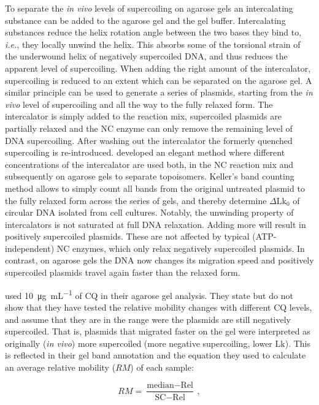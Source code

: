 \documentclass[10pt,a4]{article}
\newcommand{\ugml}{\micro\gram\per\milli\liter}
\newcommand{\lk}{\ensuremath{\text{Lk}}}
\newcommand{\dlkr}{\ensuremath{\Delta\text{Lk}_0}}
\newcommand{\ie}{\textit{i.e.}}
\begin{document}
To separate the \textit{in vivo} levels of supercoiling on agarose
gels an intercalating substance can be added to the agarose gel and
the gel buffer.  Intercalating substances reduce the helix rotation
angle between the two bases they bind to, \ie{}, they locally unwind
the helix. This absorbs some of the torsional strain of the underwound
helix of negatively supercoiled DNA, and thus reduces the apparent
level of supercoiling.  When adding the right amount of the
intercalator, supercoiling is reduced to an extent which can be
separated on the agarose gel.  A similar principle can be used to
generate a series of plasmids, starting from the \textit{in vivo}
level of supercoiling and all the way to the fully relaxed form. The
intercalator is simply added to the reaction mix, supercoiled plasmids
are partially relaxed and the NC enzyme can only remove the remaining
level of DNA supercoiling.  After washing out the intercalator the
formerly quenched supercoiling is re-introduced. 
\citet{Keller1975b} developed an elegant method where different
concentrations of the intercalator are used both, in the NC reaction
mix and subsequently on agarose gels to separate topoisomers. Keller's
band counting method allows to simply count all bands from the
original untreated plasmid to the fully relaxed form across the series
of gels, and thereby determine \dlkr{} of circular DNA
isolated from cell cultures.
%
Notably, the unwinding property of intercalators is not saturated at
full DNA relaxation. Adding more will result in positively supercoiled
plasmids. These are not affected by typical (ATP-independent) NC
enzymes, which only relax negatively supercoiled plasmids. In
contrast, on agarose gels the DNA now changes its migration speed and
positively supercoiled plasmids travel again faster than the relaxed
form.

\citet{Woelfle2007} used \SI{10}{\ugml} of CQ in their
agarose gel analysis. They state but do not show that they have tested
the relative mobility changes with different CQ levels, and assume
that they are in the range were the plasmids are still negatively
supercoiled.  That is, plasmids that migrated faster on the gel were
interpreted as originally (\textit{in vivo}) more supercoiled (more
negative supercoiling, lower $\lk$). This is reflected in their
gel band annotation and the equation they used to calculate an average
relative mobility ($RM$) of each sample:

\begin{equation}
  RM = \frac{\text{median} - \text{Rel}}{\text{SC} - \text{Rel}}\,,
\end{equation}
\end{document}
